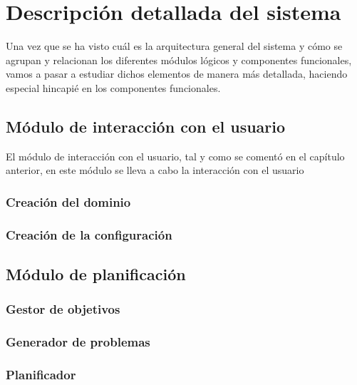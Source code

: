 
\chapter{Descripción detallada del sistema}

Una vez que se ha visto cuál es la arquitectura general del sistema y cómo se agrupan
y relacionan los diferentes módulos lógicos y componentes funcionales, vamos a pasar
a estudiar dichos elementos de manera más detallada, haciendo especial hincapié en los
componentes funcionales.

\section{Módulo de interacción con el usuario}

El módulo de interacción con el usuario, tal y como se comentó en el capítulo anterior,
en este módulo se lleva a cabo la interacción con el usuario

\subsection{Creación del dominio}

\subsection{Creación de la configuración}

\section{Módulo de planificación}

\subsection{Gestor de objetivos}

\subsection{Generador de problemas}

\subsection{Planificador}

